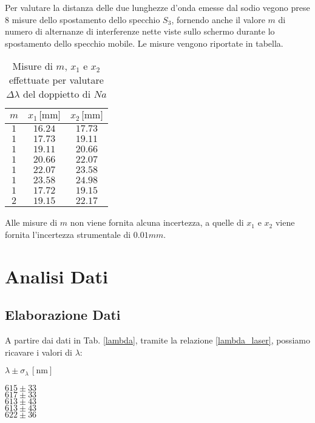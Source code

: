 \documentclass[]{article}
\let\oldsection\section%
\renewcommand{\section}{%
	\renewcommand{\theequation}{\thesection.\arabic{equation}}%
	\oldsection}%
\let\oldsubsection\subsection%
\renewcommand{\subsection}{%
	\renewcommand{\theequation}{\thesubsection.\arabic{equation}}%
	\oldsubsection}%
\begin{document}
Per valutare la distanza delle due lunghezze d'onda emesse dal sodio vegono prese 8 misure dello spostamento dello specchio $S_3$, fornendo anche il valore $m$ di numero di alternanze di interferenze nette viste sullo schermo durante lo spostamento dello specchio mobile. Le misure vengono riportate in tabella.

\begin{table}[H]
    \centering

    \begin{tabular}{||c|c|c||}
        \hline
        $m $ & $x_1 \, \text{[mm]}$ & $x_2\, \text{[mm]}$ \\
        \hline\hline

        $1$ & $16.24$ & $17.73$ \\\hline
        $1$ & $17.73$ & $19.11$ \\\hline
        $1$ & $19.11$ & $20.66$ \\\hline
        $1$ & $20.66$ & $22.07$ \\\hline
        $1$ & $22.07$ & $23.58$ \\\hline
        $1$ & $23.58$ & $24.98$ \\\hline
        $1$ & $17.72$ & $19.15$ \\\hline
        $2$ & $19.15$ & $22.17$ \\\hline
    
    \end{tabular}
    \caption{Misure di $m$, $x_1$ e $x_2$ effettuate per valutare $\Delta \lambda$ del doppietto di $Na$ }
    \label{sodio}    
\end{table}

Alle misure di $m$ non viene fornita alcuna incertezza, a quelle di $x_1$ e $x_2$ viene fornita l'incertezza strumentale di $0.01mm$.


\section{Analisi Dati}

\subsection{Elaborazione Dati}

A partire dai dati in Tab. \ref{lambda}, tramite la relazione \ref{lambda_laser}, possiamo ricavare i valori di $\lambda$:

\begin{table}[H]
    \centering
    
    \begin{tabular}[||c||]
        \hline
        $\lambda \pm \sigma_{\lambda} \, \left[\text{nm}\right]$ \\
        \hline\hline

        $615 \pm 33$ \\\hline
        $617 \pm 33$ \\\hline
        $613 \pm 43$ \\\hline
        $613 \pm 43$ \\\hline
        $622 \pm 36$ \\\hline
    
    \end{tabular}
\end{table}
\end{document}
